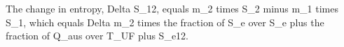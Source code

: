 The change in entropy, Delta S_12, equals m_2 times S_2 minus m_1 times S_1, which equals Delta m_2 times the fraction of S_e over S_e plus the fraction of Q_aus over T_UF plus S_e12.